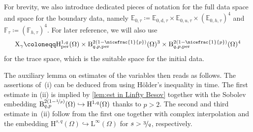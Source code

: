\documentclass[10pt]{amsart}
\theoremstyle{plain}
\theoremstyle{definition}
\theoremstyle{thm}
\numberwithin{equation}{section}
\newcommand{\rL}{\mathrm{L}}
\newcommand{\rH}{\mathrm{H}}
\newcommand{\rB}{\mathrm{B}}
\newcommand{\rX}{\mathrm{X}}
\newcommand{\E}{\mathbb{E}}
\newcommand{\F}{\mathbb{F}}
\newcommand{\per}{\mathrm{per}}
\newcommand{\rd}{\mathrm{d}}
\begin{document}
For brevity, we also introduce dedicated pieces of notation for the full data space and space for the boundary data, namely $\E_{0,\tau} \coloneqq \E_{0,\rd,\tau} \times \E_{0,u,\tau} \times (\E_{0,h,\tau})^4$ and $\F_{\tau} \coloneqq  (\F_{h,\tau})^4$.
For later reference, we will also use 
\begin{equation*}
    \rX_\gamma \coloneqq \rH_\per^{1,q}(\Omega) \times \rB_{q,p,\per}^{2(1-\nicefrac{1}{p})}(\Omega)^3 \times \rB_{q,p,\per}^{2(1-\nicefrac{1}{p})}(\Omega)^4
\end{equation*}
for the trace space, which is the suitable space for the initial data.

The auxiliary lemma on estimates of the variables then reads as follows.
The assertions of~(i) can be deduced from using H\"older's inequality in time.
The first estimate in (ii) is implied by \autoref{lem:est in Linfty Besov} together with the Sobolev embedding $\rB_{q,p}^{2(1-\nicefrac{1}{p})}(\Omega) \hookrightarrow \rH^{1,q}(\Omega)$ thanks to $p > 2$.
The second and third estimate in~(ii) follow from the first one together with complex interpolation and the embedding $\rH^{s,q}(\Omega) \hookrightarrow \rL^\infty(\Omega)$ for $s > \nicefrac{3}{q}$, respectively.
\end{document}

